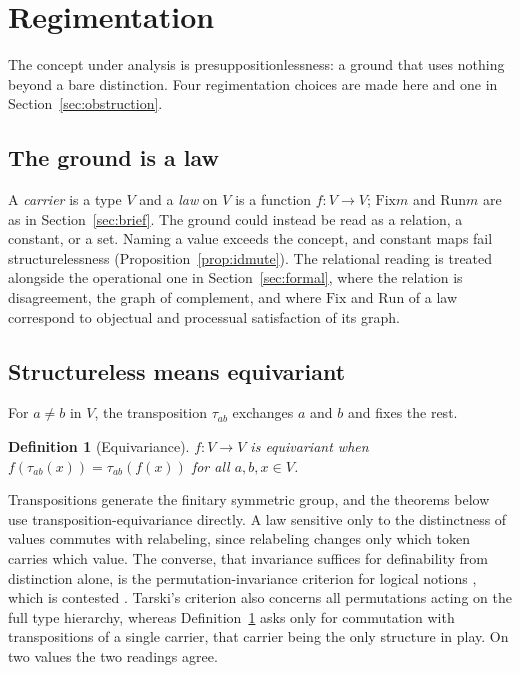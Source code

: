 \documentclass[11pt]{article}
\newtheorem{definition}[theorem]{Definition}
\newcommand{\Fix}{\mathrm{Fix}}
\newcommand{\Run}{\mathrm{Run}}
\begin{document}
\section{Regimentation}
\label{sec:regiment}

The concept under analysis is presuppositionlessness: a ground that uses nothing beyond a bare distinction. Four regimentation choices are made here and one in Section~\ref{sec:obstruction}.

\subsection{The ground is a law}

A \emph{carrier} is a type $V$ and a \emph{law} on $V$ is a function $f : V \to V$; $\Fix m$ and $\Run m$ are as in Section~\ref{sec:brief}. The ground could instead be read as a relation, a constant, or a set. Naming a value exceeds the concept, and constant maps fail structurelessness (Proposition~\ref{prop:idmute}). The relational reading is treated alongside the operational one in Section~\ref{sec:formal}, where the relation is disagreement, the graph of complement, and where $\Fix$ and $\Run$ of a law correspond to objectual and processual satisfaction of its graph.

\subsection{Structureless means equivariant}

For $a \neq b$ in $V$, the transposition $\tau_{ab}$ exchanges $a$ and $b$ and fixes the rest.

\begin{definition}[Equivariance]
\label{def:equiv}
$f : V \to V$ is \emph{equivariant} when $f(\tau_{ab}(x)) = \tau_{ab}(f(x))$ for all $a, b, x \in V$.
\end{definition}

Transpositions generate the finitary symmetric group, and the theorems below use transposition-equivariance directly. A law sensitive only to the distinctness of values commutes with relabeling, since relabeling changes only which token carries which value. The converse, that invariance suffices for definability from distinction alone, is the permutation-invariance criterion for logical notions \cite{tarski1986,sher1991}, which is contested \cite{mcgee1996,feferman1999}. Tarski's criterion also concerns all permutations acting on the full type hierarchy, whereas Definition~\ref{def:equiv} asks only for commutation with transpositions of a single carrier, that carrier being the only structure in play. On two values the two readings agree.
\end{document}
